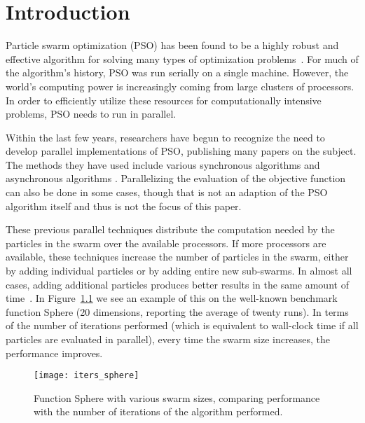 \documentclass[ms,electronic,twosidetoc,letterpaper,chaptercenter,parttop,equalmargins]{byumsphd}
\title{\Title}
\author{\Author}
\newcommand{\fig}[1]{Figure~\ref{fig:#1}}
\begin{document}
\maketitle
{}

\chapter{Introduction}
\label{sec:intro}

Particle swarm optimization (PSO) has been found to be a highly robust and
effective algorithm for solving many types of optimization
problems~\citep{poli-2008-pso-applications}.  For much of the algorithm's
history, PSO was run serially on a single machine.  However, the world's
computing power is increasingly coming from large clusters of processors.  In
order to efficiently utilize these resources for computationally intensive
problems, PSO needs to run in parallel.

Within the last few years, researchers have begun to recognize the need to
develop parallel implementations of PSO, publishing many papers on the subject.
The methods they have used include various synchronous algorithms
\citep{parsopoulos-2004-parallel-vector-evaluated-pso} and asynchronous
algorithms \citep{mostaghim-2006-multi-objective-pso-on-grids}.  Parallelizing
the evaluation of the objective function can also be done in some cases, though
that is not an adaption of the PSO algorithm itself and thus is not the focus
of this paper.

These previous parallel techniques distribute the computation needed by the
particles in the swarm over the available processors.  If more processors are
available, these techniques increase the number of particles in the swarm,
either by adding individual particles or by adding entire new sub-swarms.  In
almost all cases, adding additional particles produces better results in the
same amount of time~\citep{mcnabb-2009-large-particle-swarms}.  In
\fig{iters-sphere} we see an example of this on the well-known benchmark
function Sphere (20 dimensions, reporting the average of twenty runs).  In
terms of the number of iterations performed (which is equivalent to wall-clock
time if all particles are evaluated in parallel), every time the swarm size
increases, the performance improves.

\begin{figure}
  \centering
  \texttt{[image: iters\_sphere]}
  \caption{Function Sphere with various swarm sizes, comparing performance with
  the number of iterations of the algorithm performed.}
  \label{fig:iters-sphere}
\end{figure}
\end{document}
